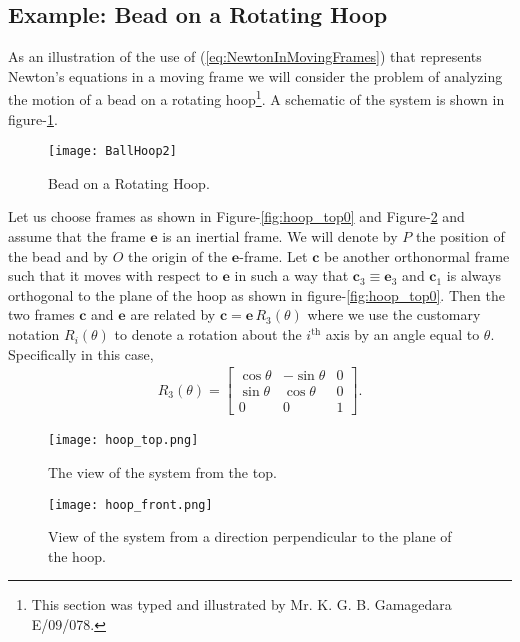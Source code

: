 \documentclass[graybox,envcountchap,sectrefs]{svmonoMuga}
\begin{document}
\subsection{Example: Bead on a Rotating Hoop}\label{Secn:BeadOnRotatingHoop}
As an illustration of the use of (\ref{eq:NewtonInMovingFrames}) that represents Newton's equations in a moving frame we will consider the problem of analyzing the motion of a bead on a rotating hoop\footnote{This section was typed and illustrated by Mr. K. G. B. Gamagedara E/09/078.}. A schematic of the system is shown in figure-\ref{Fig:BeadOnHoop0}. 
\begin{figure}[h]
\begin{center}
\texttt{[image: BallHoop2]}
\renewcommand{\baselinestretch}{1}\selectfont
\caption{Bead on a Rotating Hoop.}
\label{Fig:BeadOnHoop0}
\renewcommand{\baselinestretch}{1.5}\selectfont
\end{center}
\end{figure}



Let us choose frames as shown in Figure-\ref{fig:hoop_top0} and Figure-\ref{fig:hoop_front0} and assume that the frame $\mathbf{e}$ is an inertial frame. We will denote by $P$ the position of the bead and by $O$ the origin of the $\mathbf{e}$-frame. Let $\mathbf{c}$
be another orthonormal frame such that it moves with respect to $\mathbf{e}$ in such a way that $\mathbf{c}_3\equiv \mathbf{e}_3$ and $\mathbf{c}_1$ is always orthogonal to the plane of the hoop as shown in figure-\ref{fig:hoop_top0}.
Then the two frames $\mathbf{c}$ and $\mathbf{e}$ are related by $\mathbf{c}=\mathbf{e}\,R_3(\theta)$ where we use the customary notation $R_i(\theta)$ to denote a rotation about the $i^\mathrm{th}$ axis by an angle equal to $\theta$. Specifically in this case,
\begin{align*}
R_3(\theta)=\begin{bmatrix}
\cos{\theta}&-\sin{\theta}&0\\
\sin{\theta}&\cos{\theta}&0\\
0&0&1
\end{bmatrix}.
\end{align*}


\begin{figure}[hbtp]
  \begin{center}
  \texttt{[image: hoop\_top.png]}
  \caption{The view of the system from the top.}
  \label{fig:hoop_top0}
  \end{center}
\endminipage\hfill
{}
  \begin{center}
  \texttt{[image: hoop\_front.png]}
  \caption{View of the system from a direction perpendicular to the plane of the hoop.}
  \label{fig:hoop_front0}
  \end{center}
\endminipage\hfill
\end{figure}
\end{document}
